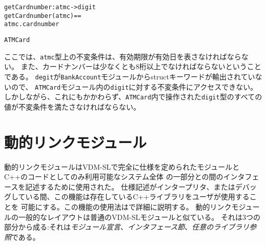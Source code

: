 \documentclass[\pformat,12pt]{jarticle}
\begin{document}
\begin{description}
\begin{alltt}

    getCardnumber : atmc ->  digit
    getCardnumber (atmc) ==
      atmc.cardnumber

 ATMCard
\end{alltt}
ここでは、\texttt{atmc}型上の不変条件は、有効期限が有効日を表さなければならない。
また、カードナンバーは少なくとも8桁以上でなければならないということである。 
\texttt{degit}が\texttt{BankAccount}モジュールからstructキーワードが輸出されていないので、
\texttt{ATMCard}モジュール内の\texttt{digit}に対する不変条件にアクセスできない。
しかしながら、これにもかかわらず、\texttt{ATMCard}内で操作された\texttt{digit}型のすべての値が不変条件を満たさなければならない。

\end{description}


\section{動的リンクモジュール}\label{sec:DLmodules}

動的リンクモジュールはVDM-SLで完全に仕様を定められたモジュールとC++のコードとしてのみ利用可能なシステム全体
の一部分との間のインタフェースを記述するために使用された。
仕様記述がインタープリタ、またはデバッグしている間、この機能は存在しているC++ライブラリをユーザが使用することを
可能にする。この機能の使用法は\cite{DLMan-SCSK}で詳細に説明する。
動的リンクモジュールの一般的なレイアウトは普通のVDM-SLモジュールと似ている。
それは3つの部分から成る:それは\emph{モジュール宣言}、\emph{インタフェース節}、\emph{任意のライブラリ参照}である。
\end{document}
